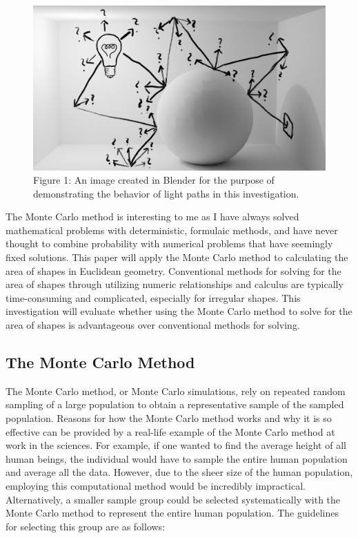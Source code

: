 \documentclass[11pt]{article}
\begin{document}
\begin{figure}[h]
\includegraphics[scale=.15]{blackandwhite}
\centering\\
\footnotesize\centering Figure 1: An image created in Blender for the purpose of demonstrating the behavior of light paths in this investigation.
\end{figure}

\normalsize The Monte Carlo method is interesting to me as I have always solved mathematical problems with deterministic, formulaic methods, and have never thought to combine probability with numerical problems that have seemingly fixed solutions. This paper will apply the Monte Carlo method to calculating the area of shapes in Euclidean geometry. Conventional methods for solving for the area of shapes through utilizing numeric relationships and calculus are typically time-consuming and complicated, especially for irregular shapes. This investigation will evaluate whether using the Monte Carlo method to solve for the area of shapes is advantageous over conventional methods for solving.

\subsection{The Monte Carlo Method}

The Monte Carlo method, or Monte Carlo simulations, rely on repeated random sampling of a large population to obtain a representative sample of the sampled population. Reasons for how the Monte Carlo method works and why it is so effective can be provided by a real-life example of the Monte Carlo method at work in the sciences. For example, if one wanted to find the average height of all human beings, the individual would have to sample the entire human population and average all the data. However, due to the sheer size of the human population, employing this computational method would be incredibly impractical. Alternatively, a smaller sample group could be selected systematically with the Monte Carlo method to represent the entire human population. The guidelines for selecting this group are as follows:
\end{document}
